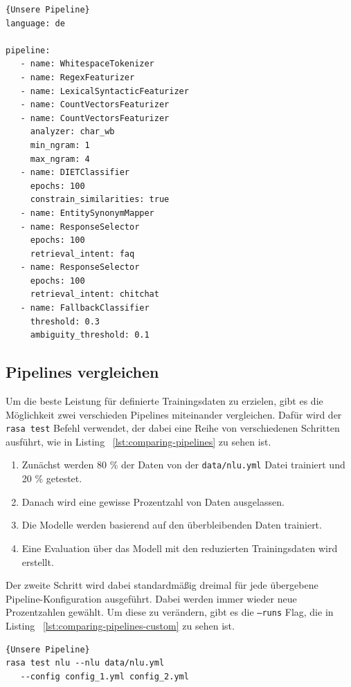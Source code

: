 \begin{lstlisting}[label={lst:our-pipeline},caption={Unsere Pipeline}]{Unsere Pipeline}
language: de

pipeline:
   - name: WhitespaceTokenizer
   - name: RegexFeaturizer
   - name: LexicalSyntacticFeaturizer
   - name: CountVectorsFeaturizer
   - name: CountVectorsFeaturizer
     analyzer: char_wb
     min_ngram: 1
     max_ngram: 4
   - name: DIETClassifier
     epochs: 100
     constrain_similarities: true
   - name: EntitySynonymMapper
   - name: ResponseSelector
     epochs: 100
     retrieval_intent: faq
   - name: ResponseSelector
     epochs: 100
     retrieval_intent: chitchat
   - name: FallbackClassifier
     threshold: 0.3
     ambiguity_threshold: 0.1
\end{lstlisting}

\subsection{Pipelines vergleichen}\label{subsec:comparing-pipelines}

Um die beste Leistung für definierte Trainingsdaten zu erzielen, gibt es die Möglichkeit zwei verschieden Pipelines miteinander vergleichen.
Dafür wird der \texttt{rasa test} Befehl verwendet, der dabei eine Reihe von verschiedenen Schritten ausführt, wie in Listing ~\ref{lst:comparing-pipelines} zu sehen ist.

\begin{enumerate}
    \item Zunächst werden 80 \% der Daten von der \texttt{data/nlu.yml} Datei trainiert und 20 \% getestet.
    \item Danach wird eine gewisse Prozentzahl von Daten ausgelassen.
    \item Die Modelle werden basierend auf den überbleibenden Daten trainiert.
    \item Eine Evaluation über das Modell mit den reduzierten Trainingsdaten wird erstellt.\cite{comparingNLUPipelines}
\end{enumerate}

Der zweite Schritt wird dabei standardmäßig dreimal für jede übergebene Pipeline-Konfiguration ausgeführt.
Dabei werden immer wieder neue Prozentzahlen gewählt.
Um diese zu verändern, gibt es die \texttt{--runs} Flag, die in Listing ~\ref{lst:comparing-pipelines-custom} zu sehen ist.\cite{comparingNLUPipelines}

\begin{lstlisting}[label={lst:comparing-pipelines},caption={Unsere Pipeline}]{Unsere Pipeline}
rasa test nlu --nlu data/nlu.yml
   --config config_1.yml config_2.yml
\end{lstlisting}

